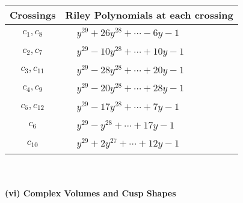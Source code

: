 \documentclass[1p]{elsarticle_modified}
\theoremstyle{definition}
\begin{document}
\begin{tabular}{m{50pt}|m{274pt}}
Crossings & \hspace{64pt}Riley Polynomials at each crossing \\
\hline $$\begin{aligned}c_{1},c_{8}\end{aligned}$$&$\begin{aligned}
&y^{29}+26 y^{28}+\cdots-6 y-1
\end{aligned}$\\
\hline $$\begin{aligned}c_{2},c_{7}\end{aligned}$$&$\begin{aligned}
&y^{29}-10 y^{28}+\cdots+10 y-1
\end{aligned}$\\
\hline $$\begin{aligned}c_{3},c_{11}\end{aligned}$$&$\begin{aligned}
&y^{29}-28 y^{28}+\cdots+20 y-1
\end{aligned}$\\
\hline $$\begin{aligned}c_{4},c_{9}\end{aligned}$$&$\begin{aligned}
&y^{29}-20 y^{28}+\cdots+28 y-1
\end{aligned}$\\
\hline $$\begin{aligned}c_{5},c_{12}\end{aligned}$$&$\begin{aligned}
&y^{29}-17 y^{28}+\cdots+7 y-1
\end{aligned}$\\
\hline $$\begin{aligned}c_{6}\end{aligned}$$&$\begin{aligned}
&y^{29}- y^{28}+\cdots+17 y-1
\end{aligned}$\\
\hline $$\begin{aligned}c_{10}\end{aligned}$$&$\begin{aligned}
&y^{29}+2 y^{27}+\cdots+12 y-1
\end{aligned}$\\
\hline
\end{tabular}\\~\\
\newpage\flushleft \textbf{(vi) Complex Volumes and Cusp Shapes}
\end{document}
